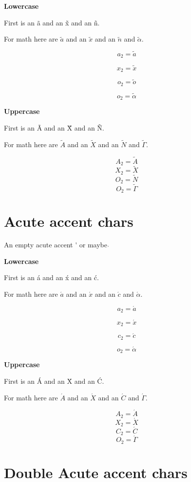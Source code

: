 ﻿\documentclass{article}
\begin{document}
\textbf{Lowercase}

First is an \~{a} and an \~{x} and an \~{n}.

For math here are $\tilde{a}$ and an $\tilde{x}$ and an $\tilde{n}$ and $\tilde{\alpha}$.

$$a_2=\tilde{a}$$

$$x_2=\tilde{x}$$

$$o_2=\tilde{o}$$

$$o_2=\tilde{\alpha}$$


\textbf{Uppercase}

First is an \~{A} and an \~{X} and an \~{N}.

For math here are $\tilde{A}$ and an $\tilde{X}$ and an $\tilde{N}$ and $\tilde{\Gamma}$.

$$A_2=\tilde{A}$$
$$X_2=\tilde{X}$$
$$O_2=\tilde{N}$$
$$O_2=\tilde{\Gamma}$$




\section{Acute accent chars}

An empty acute accent \'{} or maybe $\acute{}$

\textbf{Lowercase}

First is an \'{a} and an \'{x} and an \'{c}.

For math here are $\acute{a}$ and an $\acute{x}$ and an $\acute{c}$ and $\acute{\alpha}$.

$$a_2=\acute{a}$$

$$x_2=\acute{x}$$

$$c_2=\acute{c}$$

$$o_2=\acute{\alpha}$$

\textbf{Uppercase}

First is an \'{A} and an \'{X} and an \'{C}.

For math here are $\acute{A}$ and an $\acute{X}$ and an $\acute{C}$ and $\acute{\Gamma}$.

$$A_2=\acute{A}$$
$$X_2=\acute{X}$$
$$C_2=\acute{C}$$
$$O_2=\acute{\Gamma}$$




\section{Double Acute accent chars}
\end{document}
